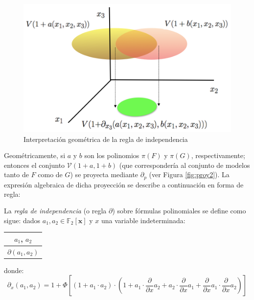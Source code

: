 \vspace{0.5cm}
\begin{figure}[h]
	\centering
		\includegraphics[scale=0.65]{imagenes/indegeo.png}
	\caption{Interpretación geométrica de la regla de independencia}
	\label{fig:comple}
\end{figure}
\vspace{0.5cm}

Geométricamente, si $a$ y $b$ son los polinomios $\pi (F)$ y $\pi (G)$, respectivamente; entonces el conjunto $\mathcal{V} (1+a,1+b)$ (que correspondería al conjunto de modelos tanto de $F$ como de $G$) se proyecta mediante $\partial_p$ (ver Figura \ref{fig:proy2}). La expresión algebraica de dicha proyección se describe a continuación en forma de regla:

 La \textit{regla de independencia} (o regla $\partial$) sobre fórmulas polinomiales se define como sigue: dados $a_1,a_2 \in \mathbb{F}_2 [\textbf{x}]$ y $x$ una variable indeterminada:

\begin{table}[h]
\centering
\begin{tabular}{c}
$a_1$, $a_2$ \\
\hline $\partial (a_1,a_2)$
\end{tabular}
\end{table}


\noindent donde:
$$\partial_x (a_1, a_2) = 1 + \Phi [(1+a_1 \cdot a_2) \cdot (1+a_1 \cdot \frac{\partial}{\partial x} a_2 + a_2 \cdot \frac{\partial}{\partial x} a_1 + \frac{\partial}{\partial x} a_1 \cdot \frac{\partial}{\partial x} a_2)]$$

